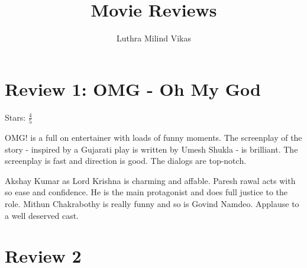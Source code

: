 \documentclass{article}
\author{Luthra Milind Vikas}
\date{}
\title{Movie Reviews}
\begin{document}
\maketitle

\section{Review 1: OMG - Oh My God}

Stars: $\frac{4}{5}$


OMG! is a full on entertainer with loads of funny moments. The screenplay of the story - inspired by a Gujarati play is written by Umesh Shukla - is brilliant. The screenplay is fast and direction is good. The dialogs are top-notch.

Akshay Kumar as Lord Krishna is charming and affable. Paresh rawal acts with so ease and confidence. He is the main protagonist and does full justice to the role. Mithun Chakrabothy is really funny and so is Govind Namdeo. Applause to a well deserved cast.


\section{Review 2}
\end{document}
